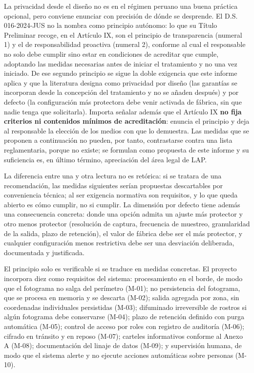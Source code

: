 La privacidad desde el diseño no es en el régimen peruano una buena
práctica opcional, pero conviene enunciar con precisión de dónde se
desprende. El D.S. 016-2024-JUS no la nombra como principio autónomo: lo
que su Título Preliminar recoge, en el Artículo IX, son el principio de
transparencia (numeral 1) y el de responsabilidad proactiva (numeral 2),
conforme al cual el responsable no solo debe cumplir sino estar en
condiciones de acreditar que cumple, adoptando las medidas necesarias
antes de iniciar el tratamiento y no una vez iniciado. De ese segundo
principio se sigue la doble exigencia que este informe aplica y que la
literatura designa como privacidad por diseño (las garantías se
incorporan desde la concepción del tratamiento y no se añaden después) y
por defecto (la configuración más protectora debe venir activada de
fábrica, sin que nadie tenga que solicitarla). Importa señalar además
que el Artículo IX \textbf{no fija criterios ni contenidos mínimos de
acreditación}: enuncia el principio y deja al responsable la elección de
los medios con que lo demuestra. Las medidas que se proponen a
continuación no pueden, por tanto, contrastarse contra una lista
reglamentaria, porque no existe; se formulan como propuesta de este
informe y su suficiencia es, en último término, apreciación del área
legal de LAP.

La diferencia entre una y otra lectura no es retórica: si se tratara de
una recomendación, las medidas siguientes serían propuestas descartables
por conveniencia técnica; al ser exigencia normativa son requisitos, y
lo que queda abierto es cómo cumplir, no si cumplir. La dimensión por
defecto tiene además una consecuencia concreta: donde una opción admita
un ajuste más protector y otro menos protector (resolución de captura,
frecuencia de muestreo, granularidad de la salida, plazo de retención),
el valor de fábrica debe ser el más protector, y cualquier configuración
menos restrictiva debe ser una desviación deliberada, documentada y
justificada.

El principio solo es verificable si se traduce en medidas concretas. El
proyecto incorpora diez como requisitos del sistema: procesamiento en el
borde, de modo que el fotograma no salga del perímetro (M-01); no
persistencia del fotograma, que se procesa en memoria y se descarta
(M-02); salida agregada por zona, sin coordenadas individuales
persistidas (M-03); difuminado irreversible de rostros si algún
fotograma debe conservarse (M-04); plazo de retención definido con purga
automática (M-05); control de acceso por roles con registro de auditoría
(M-06); cifrado en tránsito y en reposo (M-07); carteles informativos
conforme al Anexo A (M-08); documentación del linaje de datos (M-09); y
supervisión humana, de modo que el sistema alerte y no ejecute acciones
automáticas sobre personas (M-10).

